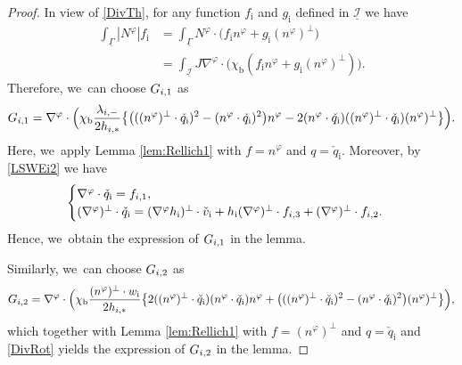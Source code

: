 \documentclass[11pt]{article}
\newcommand{\cI}{{\mathcal I}}
\newcommand{\ul}[1]{\underline{#1}}
\newcommand{\itGamma}{\mathit{\Gamma}}
\theoremstyle{definition}
\begin{document}
\begin{proof}
In view of \eqref{DivTh}, for any function $f_\mathrm{i}$ and $g_\mathrm{i}$ defined in $\ul{\cI}$ we have
\begin{align*}
\int_{\ul{\itGamma}}|N^\varphi|f_\mathrm{i}
&= \int_{\ul{\itGamma}}N^\varphi\cdot\bigl(f_\mathrm{i}n^\varphi + g_\mathrm{i}(n^\varphi)^\perp\bigr) \\
&= \int_{\ul{\cI}}J\nabla^\varphi\cdot\bigl(\chi_\mathrm{b}(f_\mathrm{i}n^\varphi + g_\mathrm{i}(n^\varphi)^\perp) \bigr).
\end{align*}
Therefore, we~can choose $G_{{\rm i},1}$ as
\[
G_{{\rm i},1} = \nabla^\varphi\cdot\Bigl(\chi_\mathrm{b}\frac{\lambda_{{\rm i},-}}{2h_{{\rm i},*}}\bigl\{
\bigl(((n^\varphi)^\perp\cdot\check{q}_\mathrm{i})^2 - (n^\varphi\cdot\check{q}_\mathrm{i})^2 \bigr)n^\varphi
- 2(n^\varphi\cdot\check{q}_\mathrm{i})((n^\varphi)^\perp\cdot\check{q}_\mathrm{i}) (n^\varphi)^\perp \bigr\} \Bigr).
\]
Here, we~apply Lemma \ref{lem:Rellich1} with $f=n^\varphi$ and $q=\check{q}_\mathrm{i}$.
Moreover, by \eqref{LSWEi2} we have
\begin{equation}\label{DivRot}
\begin{cases}
\nabla^\varphi\cdot\check{q}_\mathrm{i}=f_{{\rm i},1}, \\
(\nabla^\varphi)^\perp\cdot\check{q}_\mathrm{i}
=(\nabla^\varphi h_\mathrm{i})^\perp\cdot\check{v}_\mathrm{i} + h_\mathrm{i}(\nabla^\varphi)^\perp\cdot f_{{\rm i},3} + (\nabla^\varphi)^\perp\cdot f_{{\rm i},2}.
\end{cases}
\end{equation}
Hence, we~obtain the expression of $G_{{\rm i},1}$ in the lemma.

Similarly, we~can choose $G_{{\rm i},2}$ as
\[
G_{{\rm i},2 } = \nabla^\varphi\cdot\Bigl(\chi_\mathrm{b}\frac{(n^\varphi)^\perp\cdot w_\mathrm{i}}{2h_{{\rm i},*}}\bigl\{
2((n^\varphi)^\perp\cdot\check{q}_\mathrm{i})(n^\varphi\cdot\check{q}_\mathrm{i}) n^\varphi
+ \bigl(((n^\varphi)^\perp\cdot\check{q}_\mathrm{i})^2 - (n^\varphi\cdot\check{q}_\mathrm{i})^2 \bigr) (n^\varphi)^\perp \bigr\} \Bigr),
\]
which together with Lemma \ref{lem:Rellich1} with $f=(n^\varphi)^\perp$ and $q=\check{q}_\mathrm{i}$
and \eqref{DivRot} yields the expression of $G_{{\rm i},2}$ in the lemma.


\end{proof}
\end{document}
